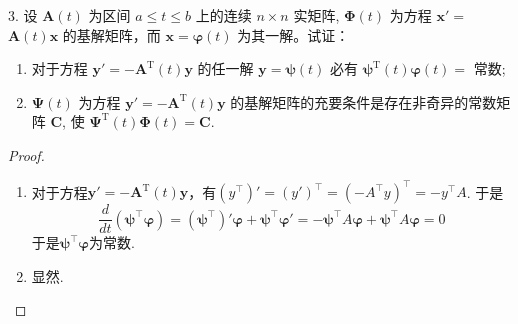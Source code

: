 \begin{exercise}
    3. 设 $\boldsymbol{A}(t)$ 为区间 $a \leqslant t \leqslant b$ 上的连续 $n \times n$ 实矩阵, $\boldsymbol{\Phi}(t)$ 为方程 $\boldsymbol{x}'=$ $\boldsymbol{A}(t) \boldsymbol{x}$ 的基解矩阵，而 $\boldsymbol{x}=\boldsymbol{\varphi}(t)$ 为其一解。试证：
    \begin{enumerate}
        \item 对于方程 $\boldsymbol{y}'=-\boldsymbol{A}^{\mathrm{T}}(t) \boldsymbol{y}$ 的任一解 $\boldsymbol{y}=\boldsymbol{\psi}(t)$ 必有 $\boldsymbol{\psi}^{\mathrm{T}}(t) \boldsymbol{\varphi}(t)=$ 常数;
        \item $\boldsymbol{\Psi}(t)$ 为方程 $\boldsymbol{y}'=-\boldsymbol{A}^{\mathrm{T}}(t) \boldsymbol{y}$ 的基解矩阵的充要条件是存在非奇异的常数矩阵 $\boldsymbol{C}$, 使 $\boldsymbol{\Psi}^{\mathrm{T}}(t) \boldsymbol{\Phi}(t)=\boldsymbol{C}$.
    \end{enumerate}
\end{exercise}

\begin{proof}
    \begin{enumerate}
        \item 对于方程$\boldsymbol{y}'=-\boldsymbol{A}^{\mathrm{T}}(t) \boldsymbol{y}$，有$(y^\top)'=(y')^\top=(-A^\top y)^\top=-y^\top A$. 于是
              \[
                  \frac{d}{dt}(\boldsymbol{\psi}^\top \boldsymbol{\varphi})=(\boldsymbol{\psi}^\top)' \boldsymbol{\varphi}+\boldsymbol{\psi}^\top \boldsymbol{\varphi}'=-\boldsymbol{\psi}^\top A \boldsymbol{\varphi}+\boldsymbol{\psi}^\top A \boldsymbol{\varphi}=0
              \]
              于是$\boldsymbol{\psi}^\top \boldsymbol{\varphi}$为常数.
        \item 显然.
    \end{enumerate}
\end{proof}

